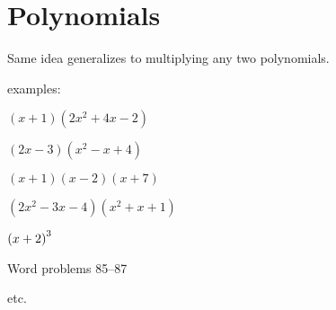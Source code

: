 \documentclass[letterpaper, landscape]{exam}
\begin{document}
  \newpage

  \section{Polynomials}
  Same idea generalizes to multiplying any two polynomials.

  examples:
  \begin{itemize*}
    \item $(x + 1)(2x^2 + 4x - 2)$
    \item $(2x - 3)(x^2 - x + 4)$
    \item $(x + 1)(x - 2)(x + 7)$
    \item $(2x^2 - 3x - 4)(x^2 + x + 1)$
    \item $\del{x + 2}^3$
    \item Word problems 85--87
    \item etc.
  \end{itemize*}
\end{document}
